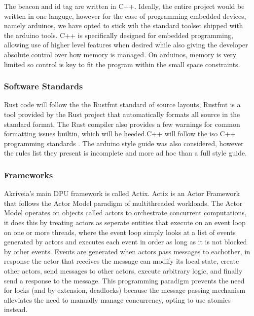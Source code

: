 \bigskip
The beacon and id tag are written in C++.
Ideally, the entire project would be written in one languge, however for the case of programming embedded devices, namely arduinos, we have opted to stick wih the standard toolset shipped with the arduino tools.
C++ is specifically designed for embedded programming, allowing use of higher level features when desired while also giving the developer absolute control over how memory is managed.
On arduinos, memory is very limited so control is key to fit the program within the small space constraints.


\medskip
\subsubsection{Software Standards}
Rust code will follow the the Rustfmt standard of source layouts, Rustfmt is a tool provided by the Rust project that automatically formats all source in the standard format. The Rust compiler also provides a few warnings for common formatting issues builtin, which will be heeded.C++ will follow the iso C++ programming standards \cite{cpp_core_guidelines}. The arduino style guide \cite{arduino_style_guide} was also considered, however the rules list they present is incomplete and more ad hoc than a full style guide.

\medskip
\subsubsection{Frameworks}
Akriveia's main DPU framework is called Actix. Actix is an Actor Framework that follows the Actor Model paradigm of multithreaded workloads. The Actor Model operates on objects called actors to orchestrate concurrent computations, it does this by treating actors as seperate entities that execute on an event loop on one or more threads, where the event loop simply looks at a list of events generated by actors and executes each event in order as long as it is not blocked by other events.
Events are generated when actors pass messages to eachother, in response the actor that receives the message can modify its local state, create other actors, send messages to other actors, execute arbitrary logic, and finally send a response to the message. This programming paradigm prevents the need for locks (and by extension, deadlocks) because the message passing mechanism alleviates the need to manually manage concurrency, opting to use atomics instead.

